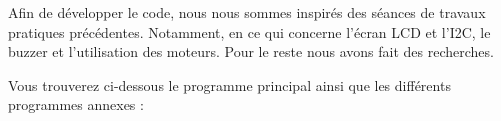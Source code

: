 Afin de développer le code, nous nous sommes inspirés des séances de travaux pratiques précédentes. Notamment, en ce qui concerne l'écran LCD et l'I2C, le buzzer et l'utilisation des moteurs. Pour le reste nous avons fait des recherches.

Vous trouverez ci-dessous le programme principal ainsi que les différents programmes annexes :

\newpage